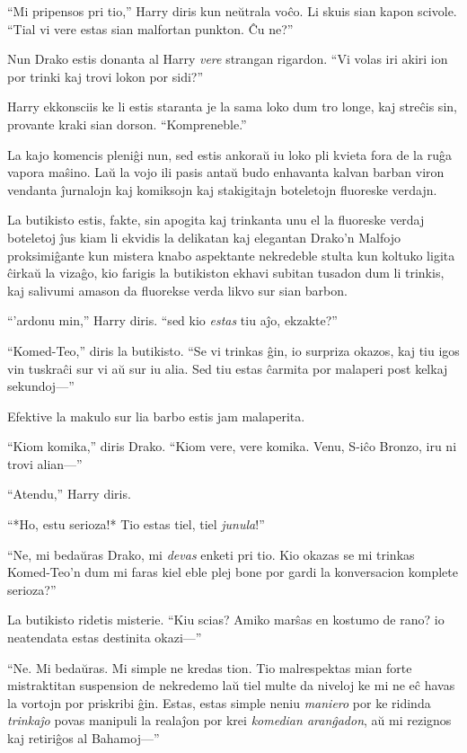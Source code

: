 ``Mi pripensos pri tio,'' Harry diris kun neŭtrala voĉo. Li skuis sian
kapon scivole. ``Tial vi vere estas sian malfortan punkton. Ĉu ne?''

Nun Drako estis donanta al Harry \emph{vere} strangan rigardon. ``Vi
volas iri akiri ion por trinki kaj trovi lokon por sidi?''

Harry ekkonsciis ke li estis staranta je la sama loko dum tro longe,
kaj streĉis sin, provante kraki sian dorson. ``Kompreneble.''

La kajo komencis pleniĝi nun, sed estis ankoraŭ iu loko pli kvieta
fora de la ruĝa vapora maŝino. Laŭ la vojo ili pasis antaŭ budo
enhavanta kalvan barban viron vendanta ĵurnalojn kaj komiksojn kaj
stakigitajn boteletojn fluoreske verdajn.

La butikisto estis, fakte, sin apogita kaj trinkanta unu el la
fluoreske verdaj boteletoj ĵus kiam li ekvidis la delikatan kaj
elegantan Drako'n Malfojo proksimiĝante kun mistera knabo aspektante
nekredeble stulta kun koltuko ligita ĉirkaŭ la vizaĝo, kio farigis la
butikiston ekhavi subitan tusadon dum li trinkis, kaj salivumi
amason da fluorekse verda likvo sur sian barbon.

``'ardonu min,'' Harry diris. ``sed kio \emph{estas} tiu aĵo, ekzakte?''

``Komed-Teo,'' diris la butikisto. ``Se vi trinkas ĝin, io surpriza
okazos, kaj tiu igos vin tuskraĉi sur vi aŭ sur iu alia. Sed tiu estas
ĉarmita por malaperi post kelkaj sekundoj—''

Efektive la makulo sur lia barbo estis jam malaperita.

``Kiom komika,'' diris Drako. ``Kiom vere, vere komika. Venu, S-iĉo
Bronzo, iru ni trovi alian—''

``Atendu,'' Harry diris.

``*Ho, estu serioza!* Tio estas tiel, tiel \emph{junula}!''

``Ne, mi bedaŭras Drako, mi \emph{devas} enketi pri tio. Kio okazas se
mi trinkas Komed-Teo'n dum mi faras kiel eble plej bone por gardi la
konversacion komplete serioza?''

La butikisto ridetis misterie. ``Kiu scias? Amiko marŝas en kostumo de
rano? io neatendata estas destinita okazi—''

``Ne. Mi bedaŭras. Mi simple ne kredas tion. Tio malrespektas mian
forte mistraktitan suspension de nekredemo laŭ tiel multe da niveloj ke
mi ne eĉ havas la vortojn por priskribi ĝin. Estas, estas simple
neniu \emph{maniero} por ke ridinda \emph{trinkaĵo} povas manipuli la
realaĵon por krei \emph{komedian aranĝadon}, aŭ mi rezignos
kaj retiriĝos al Bahamoj—''

